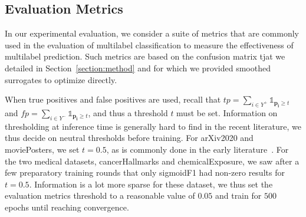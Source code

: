 
 
\subsection{Evaluation Metrics}
\label{sec:evalMetrics}

In our experimental evaluation, we consider a suite of metrics that are commonly used in the evaluation of multilabel classification to measure the effectiveness of multilabel prediction. Such metrics are based on the confusion matrix tjat we detailed in Section~\ref{section:method} and for which we provided smoothed surrogates to optimize directly.

When true positives and false positives are used, recall that \(t p=\sum_{i \in Y^{+}} \mathds{1}_{\mathbf{p_i} \geq t}\) and \(f p=\sum_{i \in Y^{-}} \mathds{1}_{\mathbf{p_i} \geq t}\), and thus a threshold \(t\) must be set. Information on thresholding at inference time is generally hard to find in the recent literature, we thus decide on neutral thresholds before training. For arXiv2020 and moviePosters, we set \(t = 0.5\), as is commonly done in the early literature~\cite{multilabelReview, thresh0.5}.
For the two medical datasets, cancerHallmarks and chemicalExposure, we saw after a few preparatory training rounds that only sigmoidF1 had non-zero results for \(t = 0.5\). Information is a lot more sparse for these dataset, we thus set the evaluation metrics threshold to a reasonable value of $0.05$ and train for $500$ epochs until reaching convergence. 

